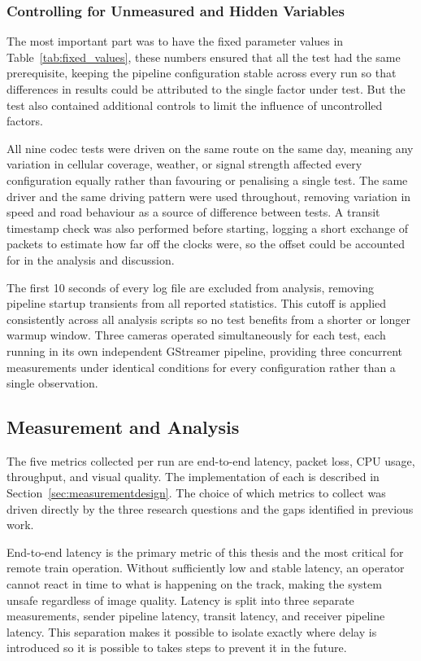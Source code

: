 \subsubsection{Controlling for Unmeasured and Hidden Variables}

The most important part was to have the fixed parameter values in Table~\ref{tab:fixed_values}, these numbers ensured that all the test had the same prerequisite, keeping the pipeline configuration stable across every run so that differences in results could be attributed to the single factor under test. But the test also contained additional controls to limit the influence of uncontrolled factors.

All nine codec tests were driven on the same route on the same day, meaning any variation in cellular coverage, weather, or signal strength affected every configuration equally rather than favouring or penalising a single test. The same driver and the same driving pattern were used throughout, removing variation in speed and road behaviour as a source of difference between tests. A transit timestamp check was also performed before starting, logging a short exchange of packets to estimate how far off the clocks were, so the offset could be accounted for in the analysis and discussion.

The first 10 seconds of every log file are excluded from analysis, removing pipeline startup transients from all reported statistics. This cutoff is applied consistently across all analysis scripts so no test benefits from a shorter or longer warmup window. Three cameras operated simultaneously for each test, each running in its own independent GStreamer pipeline, providing three concurrent measurements under identical conditions for every configuration rather than a single observation.

\subsection{Measurement and Analysis}

The five metrics collected per run are end-to-end latency, packet loss, CPU usage, throughput, and visual quality. The implementation of each is described in Section~\ref{sec:measurementdesign}. The choice of which metrics to collect was driven directly by the three research questions and the gaps identified in previous work.

End-to-end latency is the primary metric of this thesis and the most critical for remote train operation. Without sufficiently low and stable latency, an operator cannot react in time to what is happening on the track, making the system unsafe regardless of image quality. Latency is split into three separate measurements, sender pipeline latency, transit latency, and receiver pipeline latency. This separation makes it possible to isolate exactly where delay is introduced so it is possible to takes steps to prevent it in the future.

